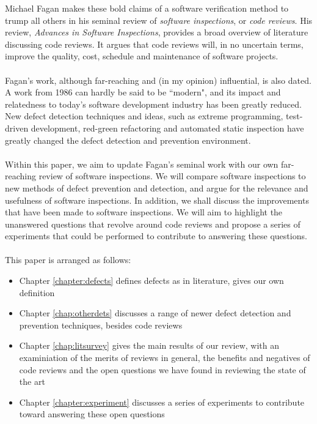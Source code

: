 Michael Fagan \cite{AdvancesInSoftwareInspection} makes these bold claims of a
software verification method to trump all others in his seminal review of {\em
  software inspections}, or {\em code reviews}.
His review, {\it Advances in Software Inspections}, provides a broad overview of
literature discussing code reviews.
It argues that code reviews will, in no uncertain terms, improve the quality,
   cost, schedule and maintenance of software projects.\\
\\
Fagan's work, although far-reaching and (in my opinion) influential, is also
dated.
A work from 1986 can hardly be said to be ``modern", and its impact and
relatedness to today's software development industry has been greatly reduced.
New defect detection techniques and ideas, such as extreme programming,
test-driven development, red-green refactoring and automated static
inspection have greatly changed the defect detection and prevention
environment.\\
\\
Within this paper, we aim to update Fagan's seminal work with our own
far-reaching review of software inspections.
We will compare software inspections to new methods of defect prevention and
detection, and argue for the relevance and usefulness of software inspections.
In addition, we shall discuss the improvements that have been made to software
inspections.
We will aim to highlight the unanswered questions that revolve around code
reviews and propose a series of experiments that could be performed to
contribute to answering these questions.\\
\\
This paper is arranged as follows:
\begin{itemize}
  \item Chapter \ref{chapter:defects} defines defects as in literature, gives
  our own definition 
  \item Chapter \ref{chap:otherdets} discusses a range of newer defect detection
  and prevention techniques, besides code reviews
  \item Chapter \ref{chap:litsurvey} gives the main results of our review, with
  an examiniation of the merits of reviews in general, the benefits and
  negatives of code reviews and the open questions we have found in reviewing
  the state of the art
  \item Chapter \ref{chapter:experiment} discusses a series of experiments to
  contribute toward answering these open questions
\end{itemize}

